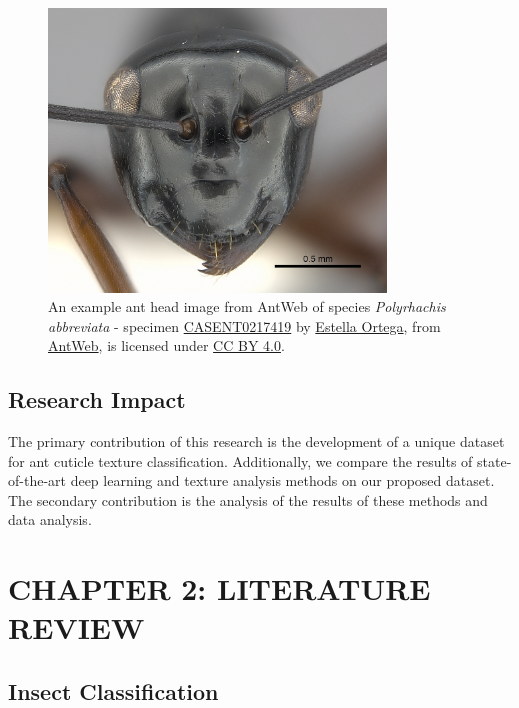 \documentclass[12pt]{article}
\begin{document}
\begin{figure}[ht]
    \centering
    \includegraphics[width=0.8\textwidth]{assets/images/CASENT0217419.jpg}
    \caption{ An example ant head image from AntWeb of species
        \textit{Polyrhachis abbreviata} - specimen
        \href{https://www.antweb.org/bigPicture.do?name=casent0217419&shot=h&number=1}{CASENT0217419}
        by \href{https://www.antweb.org/artist.do?id=92}{Estella Ortega}, from
        \href{https://www.antweb.org}{AntWeb}, is licensed under
        \href{https://creativecommons.org/licenses/by/4.0/}{CC BY 4.0}.}
    \label{fig:CASENT0217419}
\end{figure}

\subsection{Research Impact}

The primary contribution of this research is the development of a unique dataset
for ant cuticle texture classification. Additionally, we compare the results of
state-of-the-art deep learning and texture analysis methods on our proposed
dataset. The secondary contribution is the analysis of the results of these
methods and data analysis.
\newpage
\section{CHAPTER 2: LITERATURE REVIEW}

\subsection{Insect Classification}
\end{document}
